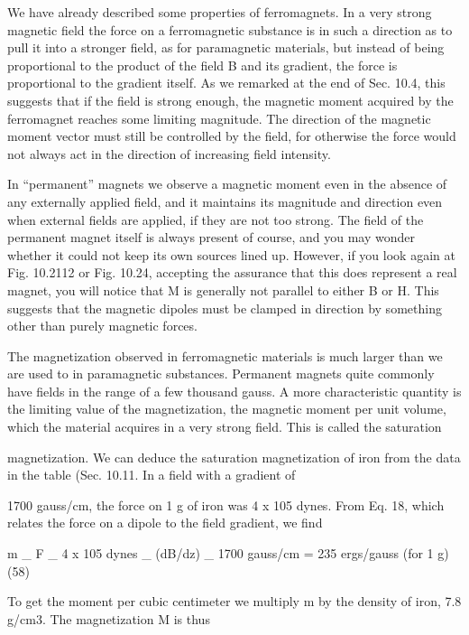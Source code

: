 We have already described some properties of ferromagnets. In
a very strong magnetic field the force on a ferromagnetic substance
is in such a direction as to pull it into a stronger field, as for 
paramagnetic materials, but instead of being proportional to the product
of the field B and its gradient, the force is proportional to the gradient
itself. As we remarked at the end of Sec. 10.4, this suggests
that if the field is strong enough, the magnetic moment acquired by
the ferromagnet reaches some limiting magnitude. The direction
of the magnetic moment vector must still be controlled by the field,
for otherwise the force would not always act in the direction of increasing
field intensity.

In ``permanent'' magnets we observe a magnetic moment even in
the absence of any externally applied field, and it maintains its magnitude
and direction even when external fields are applied, if they
are not too strong. The field of the permanent magnet itself is always
present of course, and you may wonder whether it could not keep
its own sources lined up. However, if you look again at Fig. 10.2112
or Fig. 10.24, accepting the assurance that this does represent a real
magnet, you will notice that M is generally not parallel to either B
or H. This suggests that the magnetic dipoles must be clamped in
direction by something other than purely magnetic forces.

The magnetization observed in ferromagnetic materials is much
larger than we are used to in paramagnetic substances. Permanent
magnets quite commonly have fields in the range of a few thousand
gauss. A more characteristic quantity is the limiting value of the
magnetization, the magnetic moment per unit volume, which the
material acquires in a very strong field. This is called the saturation

magnetization. We can deduce the saturation magnetization of iron
from the data in the table (Sec. 10.11. In a field with a gradient of

1700 gauss/cm, the force on 1 g of iron was 4 x 105 dynes. From
Eq. 18, which relates the force on a dipole to the field gradient, we find
\begin{equation}
\end{equation}

m _ F _ 4 x 105 dynes
_ (dB/dz) _ 1700 gauss/cm
= 235 ergs/gauss (for 1 g) (58)

To get the moment per cubic centimeter we multiply m by the
density of iron, 7.8 g/cm3. The magnetization M is thus
\begin{equation}
\end{equation}

